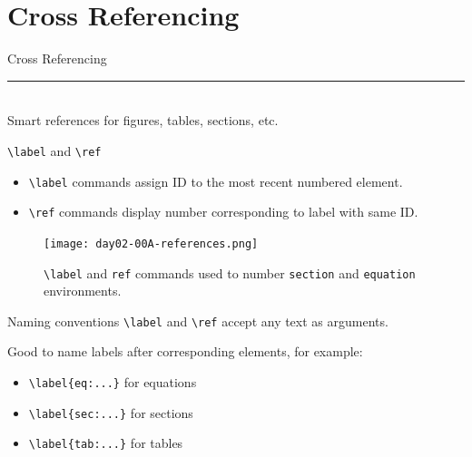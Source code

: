\documentclass{beamer}
\begin{document}
{  

  \section{Cross Referencing}

  \begin{frame}[plain]
    \vfill
    \centering
    \begin{beamercolorbox}[sep=8pt,center,shadow=true,rounded=true]{Cross Referencing}
      \insertsectionhead\par%
      \color{davisblue}\noindent\rule{10cm}{1pt} \\
      \footnotesize{Smart references for figures, tables, sections, etc.}
    \end{beamercolorbox}
    \vfill
  \end{frame}

  \begin{frame}{\texttt{\textbackslash label} and \texttt{\textbackslash ref}}
    \begin{itemize}
      \item \texttt{\textbackslash label} commands assign ID to the most recent numbered element.
      \item \texttt{\textbackslash ref} commands display number corresponding to label with same ID.
    \end{itemize}
    \begin{figure}
      \texttt{[image: day02-00A-references.png]}
      \caption{\texttt{\textbackslash label} and \texttt{ref} commands used to number \texttt{section} and \texttt{equation} environments.}
      \label{fig:day02-00A}
    \end{figure}
  \end{frame}

  \begin{frame}{Naming conventions}
    \texttt{\textbackslash label} and \texttt{\textbackslash ref} accept any text as arguments.

    Good to name labels after corresponding elements, for example:
    \begin{itemize}
      \item \texttt{\textbackslash label\{eq:...\}} for equations
      \item \texttt{\textbackslash label\{sec:...\}} for sections
      \item \texttt{\textbackslash label\{tab:...\}} for tables
    \end{itemize}
  \end{frame}

}
\end{document}
